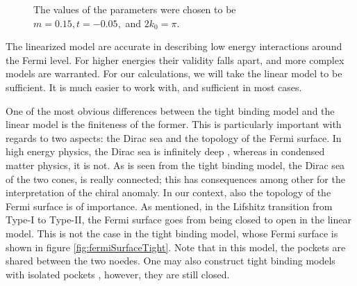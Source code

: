 \begin{figure}[ht]
  \caption{The values of the parameters were chosen to be \(m=0.15, t=-0.05, \) and \(2 k_{0}=\pi\).\label{fig:ridgeline2}}
\end{figure}


The linearized model are accurate in describing low energy interactions around the Fermi level.
For higher energies their validity falls apart, and more complex models are warranted.
For our calculations, we will take the linear model to be sufficient.
It is much easier to work with, and sufficient in most cases.

One of the most obvious differences between the tight binding model and the linear model is the finiteness of the former.
This is particularly important with regards to two aspects: the Dirac sea and the topology of the Fermi surface.
In high energy physics, the Dirac sea is infinitely deep \cite{vozmedianoTheoreticalPhysicsColloquium2021}, whereas in condensed matter physics, it is not.
As is seen from the tight binding model, the Dirac sea of the two cones, is really connected;
this has consequences among other for the interpretation of the chiral anomaly.
In our context, also the topology of the Fermi surface is of importance.
As mentioned, in the Lifshitz transition from Type-I to Type-II, the Fermi surface goes from being closed to open in the linear model.
This is not the case in the tight binding model, whose Fermi surface is shown in figure \ref{fig:fermiSurfaceTight}.
Note that in this model, the pockets are shared between the two noedes.
One may also construct tight binding models with isolated pockets \cite{mccormickMinimalModelsTopological2017}, however, they are still closed.

